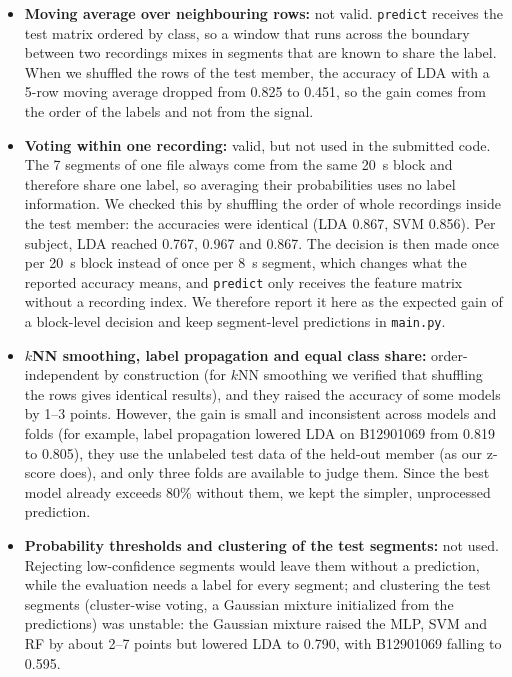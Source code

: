 \begin{itemize}[leftmargin=*]
    \item \textbf{Moving average over neighbouring rows:} not valid. \texttt{predict} receives the test matrix ordered by class, so a window that runs across the boundary between two recordings mixes in segments that are known to share the label. When we shuffled the rows of the test member, the accuracy of LDA with a 5-row moving average dropped from 0.825 to 0.451, so the gain comes from the order of the labels and not from the signal.
    \item \textbf{Voting within one recording:} valid, but not used in the submitted code. The 7 segments of one file always come from the same 20~s block and therefore share one label, so averaging their probabilities uses no label information. We checked this by shuffling the order of whole recordings inside the test member: the accuracies were identical (LDA 0.867, SVM 0.856). Per subject, LDA reached 0.767, 0.967 and 0.867. The decision is then made once per 20~s block instead of once per 8~s segment, which changes what the reported accuracy means, and \texttt{predict} only receives the feature matrix without a recording index. We therefore report it here as the expected gain of a block-level decision and keep segment-level predictions in \texttt{main.py}.
    \item \textbf{$k$NN smoothing, label propagation and equal class share:} order-independent by construction (for $k$NN smoothing we verified that shuffling the rows gives identical results), and they raised the accuracy of some models by 1--3 points. However, the gain is small and inconsistent across models and folds (for example, label propagation lowered LDA on B12901069 from 0.819 to 0.805), they use the unlabeled test data of the held-out member (as our z-score does), and only three folds are available to judge them. Since the best model already exceeds 80\% without them, we kept the simpler, unprocessed prediction.
    \item \textbf{Probability thresholds and clustering of the test segments:} not used. Rejecting low-confidence segments would leave them without a prediction, while the evaluation needs a label for every segment; and clustering the test segments (cluster-wise voting, a Gaussian mixture initialized from the predictions) was unstable: the Gaussian mixture raised the MLP, SVM and RF by about 2--7 points but lowered LDA to 0.790, with B12901069 falling to 0.595.
\end{itemize}

